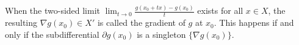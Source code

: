 When the two-sided limit $\lim_{t \to 0} \frac{g(x_0 + tx) - g(x_0)}{t}$ exists for all $x \in X$, the resulting $\nabla g(x_0) \in X'$ is called the gradient of $g$ at $x_0$. This happens if and only if the subdifferential $\partial g(x_0)$ is a singleton $\{\nabla g(x_0)\}$.